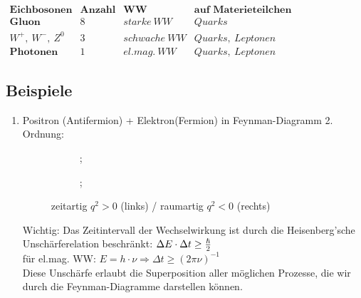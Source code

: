 \documentclass[Ex4_Zusammenfassung.tex]{subfiles}
\begin{document}
	$
	\begin{array}{c|ccc}
		\textbf{Eichbosonen} & \textbf{Anzahl} & \textbf{WW} & \textbf{auf Materieteilchen} \\
		\hline
		\textbf{Gluon} & 8 & starke\ WW & Quarks \\ 
		W^+,\ W^-,\ Z^0 & 3 & schwache\ WW & Quarks,\ Leptonen \\ 
		\textbf{Photonen} & 1 & el.mag.\ WW & Quarks,\ Leptonen
	\end{array} 
	$
	
	\subsection{Beispiele}
	
	\begin{enumerate}
		\item Positron (Antifermion) + Elektron(Fermion) in Feynman-Diagramm 2. Ordnung:
			\begin{figure}[H]
				\centering
					\quad
				\begin{subfigure}[b]{0.4\textwidth}
					;
				\end{subfigure}
				\quad
				\begin{subfigure}[b]{0.4\textwidth}
					;
				\end{subfigure}
				\caption{zeitartig $q^2 >0$ (links) / raumartig $q^2 < 0$ (rechts)}
			\end{figure}
			Wichtig: Das Zeitintervall der Wechselwirkung ist durch die Heisenberg'sche Unschärferelation beschränkt: $\Delta E \cdot \Delta t \ge \frac{\hslash}{2}$\\
			für el.mag. WW: $E = h \cdot \nu \Rightarrow \Delta t \ge (2\pi \nu)^{-1}$\\
			Diese Unschärfe erlaubt die Superposition aller möglichen Prozesse, die wir durch die Feynman-Diagramme darstellen können.


\end{enumerate}
\end{document}

